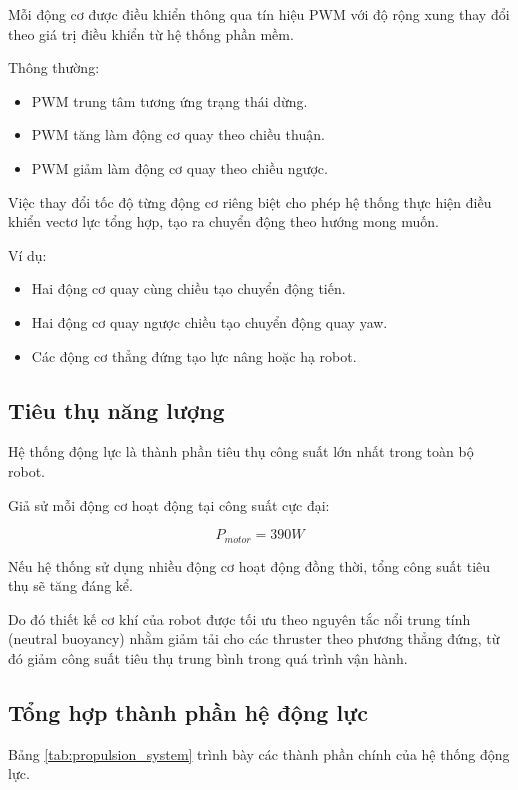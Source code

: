 \documentclass[../DoAn.tex]{subfiles}
\begin{document}
Mỗi động cơ được điều khiển thông qua tín hiệu PWM với độ rộng xung thay đổi theo giá trị điều khiển từ hệ thống phần mềm.

Thông thường:

\begin{itemize}
    \item PWM trung tâm tương ứng trạng thái dừng.
    \item PWM tăng làm động cơ quay theo chiều thuận.
    \item PWM giảm làm động cơ quay theo chiều ngược.
\end{itemize}

Việc thay đổi tốc độ từng động cơ riêng biệt cho phép hệ thống thực hiện điều khiển vectơ lực tổng hợp, tạo ra chuyển động theo hướng mong muốn.

Ví dụ:

\begin{itemize}
    \item Hai động cơ quay cùng chiều tạo chuyển động tiến.
    \item Hai động cơ quay ngược chiều tạo chuyển động quay yaw.
    \item Các động cơ thẳng đứng tạo lực nâng hoặc hạ robot.
\end{itemize}

\subsection{Tiêu thụ năng lượng}

Hệ thống động lực là thành phần tiêu thụ công suất lớn nhất trong toàn bộ robot.

Giả sử mỗi động cơ hoạt động tại công suất cực đại:

\[
P_{motor}=390W
\]

Nếu hệ thống sử dụng nhiều động cơ hoạt động đồng thời, tổng công suất tiêu thụ sẽ tăng đáng kể.

Do đó thiết kế cơ khí của robot được tối ưu theo nguyên tắc nổi trung tính (neutral buoyancy) nhằm giảm tải cho các thruster theo phương thẳng đứng, từ đó giảm công suất tiêu thụ trung bình trong quá trình vận hành.

\subsection{Tổng hợp thành phần hệ động lực}

Bảng \ref{tab:propulsion_system} trình bày các thành phần chính của hệ thống động lực.
\end{document}

